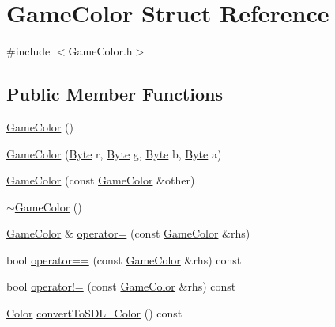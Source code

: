 \hypertarget{struct_game_color}{\section{Game\-Color Struct Reference}
\label{struct_game_color}
}


{\ttfamily \#include $<$Game\-Color.\-h$>$}

\subsection*{Public Member Functions}
\begin{DoxyCompactItemize}
\item 
\hyperlink{struct_game_color_ae0d529c16e7929ad5be5d70f7c534f16}{Game\-Color} ()
\item 
\hyperlink{struct_game_color_a34cd97b3963c2727b7fa5f6b5cb4fa94}{Game\-Color} (\hyperlink{_game_color_8h_a8390de1c62e036e839ec8150711d6539}{Byte} r, \hyperlink{_game_color_8h_a8390de1c62e036e839ec8150711d6539}{Byte} g, \hyperlink{_game_color_8h_a8390de1c62e036e839ec8150711d6539}{Byte} b, \hyperlink{_game_color_8h_a8390de1c62e036e839ec8150711d6539}{Byte} a)
\item 
\hyperlink{struct_game_color_a4be5200a3451df65b74285a87f792876}{Game\-Color} (const \hyperlink{struct_game_color}{Game\-Color} \&other)
\item 
\hyperlink{struct_game_color_aae1825180c9abfc98c62f34eb84b7d35}{$\sim$\-Game\-Color} ()
\item 
\hyperlink{struct_game_color}{Game\-Color} \& \hyperlink{struct_game_color_ac06d638251ad1384488735a7cbcfb547}{operator=} (const \hyperlink{struct_game_color}{Game\-Color} \&rhs)
\item 
bool \hyperlink{struct_game_color_a853ad75d971188c1c23bbe40ee84fd27}{operator==} (const \hyperlink{struct_game_color}{Game\-Color} \&rhs) const 
\item 
bool \hyperlink{struct_game_color_a75e2026bf463ccbd9c4faa8b8904f679}{operator!=} (const \hyperlink{struct_game_color}{Game\-Color} \&rhs) const 
\item 
\hyperlink{_default_config_8h_a2f17017b1ef643696b678a0703f0f166}{Color} \hyperlink{struct_game_color_a744c6b53268ce4cccfeb3586869acbef}{convert\-To\-S\-D\-L\-\_\-\-Color} () const 
\end{DoxyCompactItemize}

